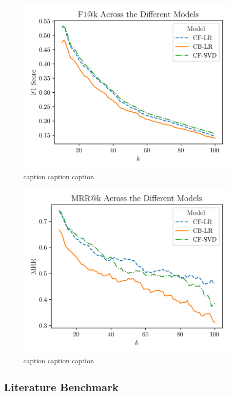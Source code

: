 \documentclass[conference]{IEEEtran}
\begin{document}
\begin{figure}[H]
    \centering
    \includegraphics[width=1\linewidth]{assets/results_f1K.png}
    \caption{caption caption caption}
    \label{fig:results_f1K}
\end{figure}

\begin{figure}[H]
    \centering
    \includegraphics[width=1\linewidth]{assets/results_mrrK.png}
    \caption{caption caption caption}
    \label{fig:results_mrrK}
\end{figure}


\subsection{Literature Benchmark}
\end{document}
